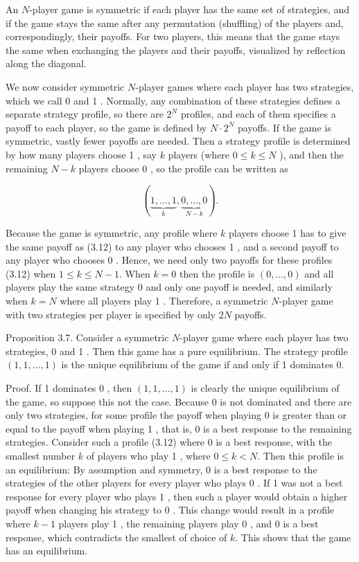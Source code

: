 \documentclass[12pt]{article}
\begin{document}
An $N$-player game is symmetric if each player has the same set of strategies, and if the game stays the same after any permutation (shuffling) of the players and, correspondingly, their payoffs. For two players, this means that the game stays\\
the same when exchanging the players and their payoffs, visualized by reflection along the diagonal.

We now consider symmetric $N$-player games where each player has two strategies, which we call 0 and 1 . Normally, any combination of these strategies defines a separate strategy profile, so there are $2^{N}$ profiles, and each of them specifies a payoff to each player, so the game is defined by $N \cdot 2^{N}$ payoffs. If the game is symmetric, vastly fewer payoffs are needed. Then a strategy profile is determined by how many players choose 1 , say $k$ players (where $0 \leq k \leq N$ ), and then the remaining $N-k$ players choose 0 , so the profile can be written as


\begin{equation*}
(\underbrace{1, \ldots, 1}_{k}, \underbrace{0, \ldots, 0}_{N-k}) . \tag{3.12}
\end{equation*}


Because the game is symmetric, any profile where $k$ players choose 1 has to give the same payoff as (3.12) to any player who chooses 1 , and a second payoff to any player who chooses 0 . Hence, we need only two payoffs for these profiles (3.12) when $1 \leq k \leq N-1$. When $k=0$ then the profile is $(0, \ldots, 0)$ and all players play the same strategy 0 and only one payoff is needed, and similarly when $k=N$ where all players play 1 . Therefore, a symmetric $N$-player game with two strategies per player is specified by only $2 N$ payoffs.

Proposition 3.7. Consider a symmetric $N$-player game where each player has two strategies, 0 and 1 . Then this game has a pure equilibrium. The strategy profile $(1,1, \ldots, 1)$ is the unique equilibrium of the game if and only if 1 dominates 0.

Proof. If 1 dominates 0 , then $(1,1, \ldots, 1)$ is clearly the unique equilibrium of the game, so suppose this not the case. Because 0 is not dominated and there are only two strategies, for some profile the payoff when playing 0 is greater than or equal to the payoff when playing 1 , that is, 0 is a best response to the remaining strategies. Consider such a profile (3.12) where 0 is a best response, with the smallest number $k$ of players who play 1 , where $0 \leq k<N$. Then this profile is an equilibrium: By assumption and symmetry, 0 is a best response to the strategies of the other players for every player who plays 0 . If 1 was not a best response for every player who plays 1 , then such a player would obtain a higher payoff when changing his strategy to 0 . This change would result in a profile where $k-1$ players play 1 , the remaining players play 0 , and 0 is a best response, which contradicts the smallest of choice of $k$. This shows that the game has an equilibrium.
\end{document}
